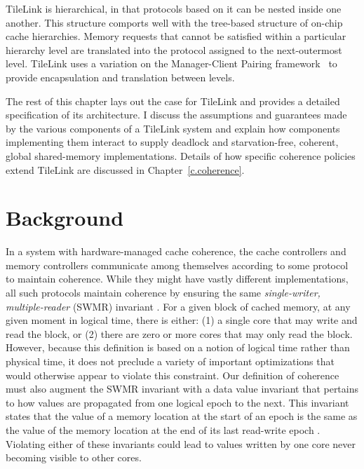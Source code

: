 TileLink is hierarchical, in that protocols based on it can be nested inside one another.
This structure comports well with the tree-based structure of on-chip cache hierarchies.
Memory requests that cannot be satisfied within a particular hierarchy level are translated into the protocol assigned to the next-outermost level. 
TileLink uses a variation on the Manager-Client Pairing framework~\cite{beu2011manager}
to provide encapsulation and translation between levels.

The rest of this chapter lays out the case for TileLink and provides a detailed specification of its architecture.
I discuss the assumptions and guarantees made by the various components of a TileLink system and explain how components implementing them interact
to supply deadlock and starvation-free, coherent, global shared-memory implementations.
Details of how specific coherence policies extend TileLink are discussed in Chapter~\ref{c.coherence}.

\section{Background}

In a system with hardware-managed cache coherence, the cache controllers and memory controllers
communicate among themselves according to some protocol to maintain coherence.
While they might have vastly different implementations, 
all such protocols maintain coherence by ensuring the same {\em single-writer, multiple-reader} (SWMR) invariant \cite{sorin2011primer}. 
For a given block of cached memory, at any given moment in logical time, there is either: 
(1) a single core that may write and read the block, or 
(2) there are zero or more cores that may only read the block.
However, because this definition is based on a notion of logical time rather than physical time,
it does not preclude a variety of important optimizations that would otherwise appear to violate this constraint.
Our definition of coherence must also augment the SWMR invariant with a data value invariant
that pertains to how values are propagated from one logical epoch to the next.
This invariant states that the value of a memory location at the start of an epoch
is the same as the value of the memory location at the end of its last read-write epoch \cite{sorin2011primer}.
Violating either of these invariants could lead to values written by one core never becoming visible to other cores.

